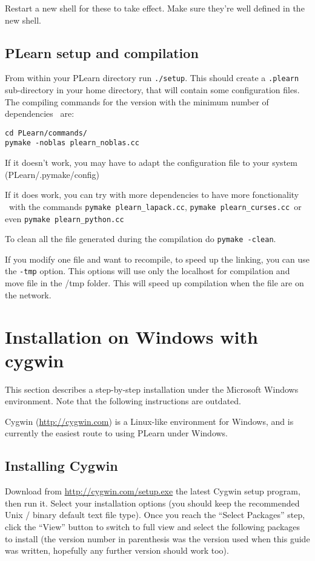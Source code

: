 \documentclass[11pt]{book}
\begin{document}
Restart a new shell for these to take effect. Make sure they're well
defined in the new shell.

\subsection{PLearn setup and compilation}

From within your PLearn directory run {\tt ./setup}. This should create a
{\tt .plearn} sub-directory in your home directory, that will contain some
configuration files.
The compiling commands for the version with the minimum number of dependencies \
are:
\begin{verbatim}
cd PLearn/commands/
pymake -noblas plearn_noblas.cc
\end{verbatim}

If it doesn't work, you may have to adapt the configuration file to your system
(PLearn/.pymake/config)

If it does work, you can try with more dependencies to have more fonctionality \
with the commands \verb!pymake plearn_lapack.cc!, \verb!pymake plearn_curses.cc!\
 or even \verb!pymake plearn_python.cc!

To clean all the file generated during the compilation do \verb!pymake -clean!.

If you modify one file and want to recompile, to speed up the linking, you can use the \verb!-tmp! option. This options will use only the localhost for compilation and move file in the /tmp folder. This will speed up compilation when the file are on the network.
\section{Installation on Windows with cygwin}
\label{sec:windows}

This section describes a step-by-step installation under the Microsoft Windows environment.
Note that the following instructions are outdated.

Cygwin (\url{http://cygwin.com}) is a Linux-like environment for Windows, and is
currently the easiest route to using PLearn under Windows.

\subsection{Installing Cygwin}
Download from \url{http://cygwin.com/setup.exe} the latest Cygwin setup program,
then run it.
Select your installation options (you should keep the recommended Unix / binary default
text file type).
Once you reach the ``Select Packages'' step, click the ``View'' button to switch
to full view and select the following packages to install (the version number in
parenthesis was the version used when this guide was written, hopefully any further
version should work too).
\end{document}
